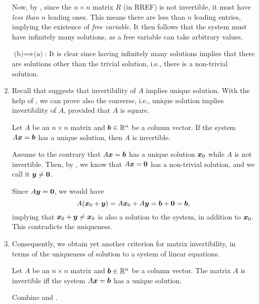 \begin{enumerate}
\begin{pf}
Now, by , since the \(n\times n\) matrix \(R\)
(in RREF) is not invertible, it must have \emph{less than} \(n\) leading ones.
This means there are less than \(n\) leading entries, implying the existence of
\emph{free variable}. It then follows that the system must have infinitely many
solutions, as a free variable can take arbitrary values.

\underline{\(\text{(b)}\implies\text{(a)}\)}: It is clear since having
infinitely many solutions implies that there are solutions other than the trivial
solution, i.e., there is a non-trivial solution.
\end{pf}

\item Recall that  suggests that invertibility of
\(A\) implies unique solution. With the help of
, we can prove also the converse, i.e.,
unique solution implies invertibility of \(A\), provided that \(A\) is square.

\begin{proposition}
\label{prp:unique-sol-imp-inv}
Let \(A\) be an \(n\times n\) matrix and \(\vb*{b}\in\mathbb{R}^n\) be a column
vector. If the system \(A\vb*{x}=\vb*{b}\) has a unique solution, then \(A\)
is invertible.
\end{proposition}
\begin{pf}
Assume to the contrary that \(A\vb*{x}=\vb*{b}\) has a unique solution
\(\vb*{x}_0\) while \(A\) is not invertible. Then, by
, we know that \(A\vb*{x}=\vb*{0}\) has a
non-trivial solution, and we call it \(\vb*{y}\ne\vb*{0}\).

Since \(A\vb*{y}=\vb*{0}\), we would have
\[
A(\vb*{x}_0+\vb*{y})=A\vb*{x}_0+A\vb*{y}=\vb*{b}+\vb*{0}=\vb*{b},
\]
implying that \(\vb*{x}_0+\vb*{y}\ne\vb*{x}_0\) is also a solution to the
system, in addition to \(\vb*{x}_0\). This contradicts the uniqueness.
\end{pf}
\item Consequently, we obtain yet another criterion for matrix invertibility,
in terms of the uniqueness of solution to a system of linear equations.

\begin{proposition}
\label{prp:inv-iff-unique-sol}
Let \(A\) be an \(n\times n\) matrix and \(\vb*{b}\in\mathbb{R}^n\) be a column
vector. The matrix \(A\) is invertible iff the system \(A\vb*{x}=\vb*{b}\)
has a unique solution.
\end{proposition}
\begin{pf}
Combine  and .
\end{pf}
\end{enumerate}

